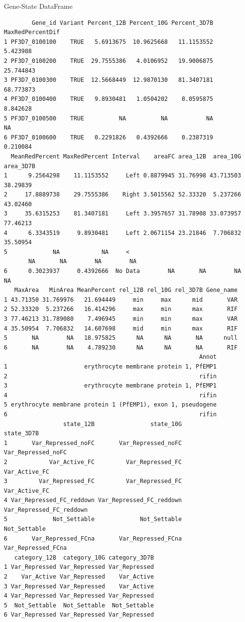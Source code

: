 \documentclass[11pt]{article}
\begin{document}
Gene-State DataFrame
\begin{verbatim}
        Gene_id Variant Percent_12B Percent_10G Percent_3D7B MaxRedPercentDif
1 PF3D7_0100100    TRUE   5.6913675  10.9625668   11.1153552         5.423988
2 PF3D7_0100200    TRUE  29.7555386   4.0106952   19.9006875        25.744843
3 PF3D7_0100300    TRUE  12.5668449  12.9870130   81.3407181        68.773873
4 PF3D7_0100400    TRUE   9.8930481   1.0504202    8.0595875         8.842628
5 PF3D7_0100500    TRUE          NA          NA           NA               NA
6 PF3D7_0100600    TRUE   0.2291826   0.4392666    0.2387319         0.210084
  MeanRedPercent MaxRedPercent Interval    areaFC area_12B  area_10G area_3D7B
1      9.2564298    11.1153552     Left 0.8879945 31.76998 43.713503  38.29839
2     17.8889738    29.7555386    Right 3.5015562 52.33320  5.237266  43.02460
3     35.6315253    81.3407181     Left 3.3957657 31.78908 33.073957  77.46213
4      6.3343519     9.8930481     Left 2.0671154 23.21846  7.706832  35.50954
5             NA            NA     <
       NA       NA        NA        NA
6      0.3023937     0.4392666  No Data        NA       NA        NA        NA
   MaxArea   MinArea MeanPercent rel_12B rel_10G rel_3D7B Gene_name
1 43.71350 31.769976   21.694449     min     max      mid       VAR
2 52.33320  5.237266   16.414296     max     min      max       RIF
3 77.46213 31.789080    7.496945     min     min      max       VAR
4 35.50954  7.706832   14.607698     mid     min      max       RIF
5       NA        NA   18.975825      NA      NA       NA      null
6       NA        NA    4.789230      NA      NA       NA       RIF
                                                        Annot
1                      erythrocyte membrane protein 1, PfEMP1
2                                                       rifin
3                      erythrocyte membrane protein 1, PfEMP1
4                                                       rifin
5 erythrocyte membrane protein 1 (PfEMP1), exon 1, pseudogene
6                                                       rifin
                 state_12B                state_10G               state_3D7B
1       Var_Repressed_noFC       Var_Repressed_noFC       Var_Repressed_noFC
2            Var_Active_FC         Var_Repressed_FC            Var_Active_FC
3         Var_Repressed_FC         Var_Repressed_FC            Var_Active_FC
4 Var_Repressed_FC_reddown Var_Repressed_FC_reddown Var_Repressed_FC_reddown
5             Not_Settable             Not_Settable             Not_Settable
6       Var_Repressed_FCna       Var_Repressed_FCna       Var_Repressed_FCna
   category_12B  category_10G category_3D7B
1 Var_Repressed Var_Repressed Var_Repressed
2    Var_Active Var_Repressed    Var_Active
3 Var_Repressed Var_Repressed    Var_Active
4 Var_Repressed Var_Repressed Var_Repressed
5  Not_Settable  Not_Settable  Not_Settable
6 Var_Repressed Var_Repressed Var_Repressed
\end{verbatim}
\end{document}

